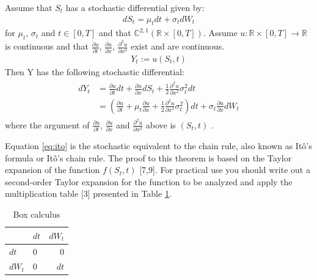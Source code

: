 \documentclass[12pt,twoside]{reedthesis}
\theoremstyle{definition}
\theoremstyle{definition}
\theoremstyle{remark}
\let\BeginKnitrBlock\begin \let\EndKnitrBlock\end
\begin{document}
  \BeginKnitrBlock{lemma}[Itô's Lemma]
  
  \protect\hypertarget{lem:itolemma}{}{\label{lem:itolemma} {} } Assume that \(S_t\) has a stochastic differential given
  by:
  \begin{align}
  dS_t = \mu_t dt + \sigma_t dW_t 
  \end{align}
  \noindent
  for \(\mu_t\), \(\sigma_t\) and \(t \in [0,T]\) and that
  \(\mathbb{C}^{2,1} \left( \mathbb{R} \times \left[0, T \right]\right)\).
  Assume \(u: \mathbb{R} \times [0, T] \rightarrow \mathbb{R}\) is
  continuous and that \(\frac{\partial u}{\partial t}\),
  \(\frac{\partial u}{\partial x}\), \(\frac{\partial^2 u}{\partial x^2}\)
  exist and are continuous.
  \begin{align*}
  Y_t := u(S_t, t)
  \end{align*}
  \noindent
  Then Y has the following stochastic differential:
  \begin{align} 
  \label{eq:ito}
  \begin{split}
      dY_t &= \frac{\partial u}{\partial t}dt + \frac{\partial u}{\partial x} dS_t + \frac{1}{2}\frac{\partial^2 u}{\partial x^2}\sigma_t^2 dt  \\[10pt] 
      &= \left( \frac{\partial u}{\partial t} + \mu_t \frac{\partial u}{\partial x} + \frac{1}{2}\frac{\partial^2 u}{\partial x^2}\sigma_t^2 \right) dt + \sigma_t \frac{\partial u}{\partial x} dW_t
  \end{split}
  \end{align}
  \noindent  where the argument of \(\frac{\partial u}{\partial t}\),
  \(\frac{\partial u}{\partial x}\) and
  \(\frac{\partial^2 u}{\partial x^2}\) above is \(\left( S_t, t \right)\)
  .
  
  \EndKnitrBlock{lemma}
  
  Equation \eqref{eq:ito} is the stochastic equivalent to the chain rule,
  also known as Itô's formula or Itô's chain rule. The proof to this
  theorem is based on the Taylor expansion of the function \(f(S_t, t)\)
  {[}7,9{]}. For practical use you should write out a second-order Taylor
  expansion for the function to be analyzed and apply the multiplication
  table {[}3{]} presented in Table \ref{mat}.
  \begin{table}[ht]
  \centering
  \begin{tabular}{llr}
    \hline 
   & $dt$ & $dW_t$ \\ 
    \hline 
  $dt$ & 0 & 0 \\ 
    $dW_t$ & 0 & $dt$ \\ 
     \hline 
  \end{tabular}
  \caption{Box calculus} 
  \label{mat}
  \end{table}
\end{document}
